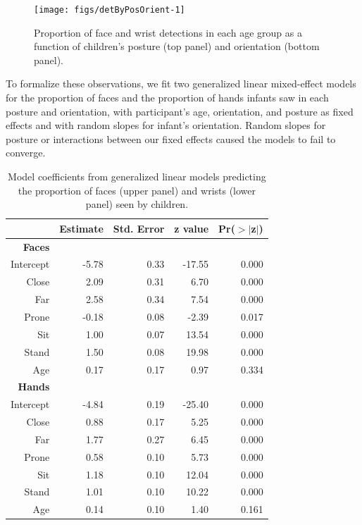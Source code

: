 \documentclass[10pt, letterpaper]{article}
\newenvironment{CodeChunk}{}{}
\begin{document}
\begin{CodeChunk}
\begin{figure}[h]

{\centering \texttt{[image: figs/detByPosOrient-1]} 

}

\caption[Proportion of face and wrist detections in each age group as a function of children's posture (top panel) and orientation (bottom panel)]{Proportion of face and wrist detections in each age group as a function of children's posture (top panel) and orientation (bottom panel).}\label{fig:detByPosOrient}
\end{figure}
\end{CodeChunk}

To formalize these observations, we fit two generalized linear
mixed-effect models for the proportion of faces and the proportion of
hands infants saw in each posture and orientation, with participant's
age, orientation, and posture as fixed effects and with random slopes
for infant's orientation. Random slopes for posture or interactions
between our fixed effects caused the models to fail to converge.

\begin{table}[ht]
\centering
\begin{tabular}{rrrrr}
  \hline
 & Estimate & Std. Error & z value & Pr($>$$|$z$|$) \\ 
  \hline
  \textbf{Faces} \\
Intercept & -5.78 & 0.33 & -17.55 & 0.000 \\ 
  Close & 2.09 & 0.31 & 6.70 & 0.000 \\ 
  Far & 2.58 & 0.34 & 7.54 & 0.000 \\ 
  Prone & -0.18 & 0.08 & -2.39 & 0.017 \\ 
  Sit & 1.00 & 0.07 & 13.54 & 0.000 \\ 
  Stand & 1.50 & 0.08 & 19.98 & 0.000 \\ 
  Age & 0.17 & 0.17 & 0.97 & 0.334 \\ 
  \hline
  \textbf{Hands} \\
  Intercept & -4.84 & 0.19 & -25.40 & 0.000 \\ 
  Close & 0.88 & 0.17 & 5.25 & 0.000 \\ 
  Far & 1.77 & 0.27 & 6.45 & 0.000 \\ 
  Prone & 0.58 & 0.10 & 5.73 & 0.000 \\ 
  Sit & 1.18 & 0.10 & 12.04 & 0.000 \\ 
  Stand & 1.01 & 0.10 & 10.22 & 0.000 \\ 
  Age & 0.14 & 0.10 & 1.40 & 0.161 \\ 
   \hline
\end{tabular}
\caption{Model coefficients from generalized linear models predicting the proportion of faces (upper panel) and wrists (lower panel) seen by children.} 
\vspace{-1em}
\end{table}
\end{document}
